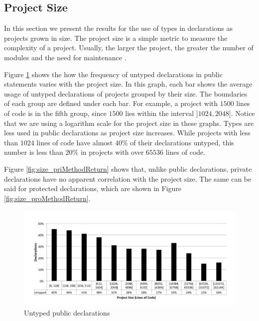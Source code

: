 \documentclass[preprint]{sigplanconf}
\begin{document}
\subsection{Project Size\label{res-size}}
In this section we present the results for the use of types in declarations as projects grown in size.
The project size is a simple metric to measure the complexity of a project.
Usually, the larger the project, the greater the number of modules and the need for maintenance \cite{Fenton1998}. 

Figure \ref{fig:size_pubMethodReturn} shows the how the frequency of untyped declarations in public statements varies with the project size.
In this graph, each bar shows the average usage of untyped declarations of projects grouped by their size.
The boundaries of each group are defined under each bar.
For example, a project with $1500$ lines of code is in the fifth group, since $1500$ lies within the interval $]1024, 2048]$.
Notice that we are using a logarithm scale for the project size in these graphs.
Types are less used in public declarations as project size increases.
While projects with less than $1024$ lines of code have almost $40\%$ of their declarations untyped, this number is  less than $20\%$ in projects with over $65536$ lines of code. 

Figure \ref{fig:size_priMethodReturn} shows that, unlike public declarations, private declarations have no apparent correlation with the project size. 
The same can be said for protected declarations, which are shown in Figure \ref{fig:size_proMethodReturn}.

\begin{figure}[ht]
\centering 
\includegraphics[width=1\textwidth]{size_pubMethodReturn} 
\caption{Untyped public declarations}
\label{fig:size_pubMethodReturn} 
\end{figure}
\end{document}
